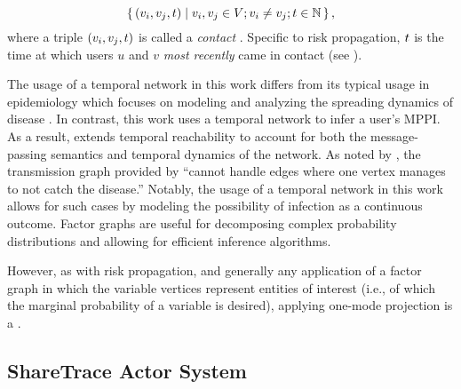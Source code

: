 \begin{equation}
    \set{ (v_{i}, v_{j}, t) | v_{i}, v_{j} \in V; v_{i} \neq v_{j}; t\in \mathbb{N}}, \label{eq:contact-seq}
\end{equation}
%
where a triple $(v_{i}, v_{j}, t)$ is called a \emph{contact} \cite{Holme2012}. Specific to risk propagation, $t$ is the time at which users $u$ and $v$ \emph{most recently} came in contact (see ).

The usage of a temporal network in this work differs from its typical usage in epidemiology which focuses on modeling and analyzing the spreading dynamics of disease \cite{Riolo2001, Danon2011, Lokhov2014, Craft2015, Pastor-Satorras2015, Koher2019, Zino2021}. In contrast, this work uses a temporal network to infer a user's MPPI. As a result,  extends temporal reachability to account for both the message-passing semantics and temporal dynamics of the network. As noted by \cite{Holme2012}, the transmission graph provided by \cite{Riolo2001} ``cannot handle edges where one vertex manages to not catch the disease.'' Notably, the usage of a temporal network in this work allows for such cases by modeling the possibility of infection as a continuous outcome.
Factor graphs are useful for decomposing complex probability distributions and allowing for efficient inference algorithms.

However, as with risk propagation, and generally any application of a factor graph in which the variable vertices represent entities of interest (i.e., of which the marginal probability of a variable is desired), applying one-mode projection is a .

\subsection{ShareTrace Actor System}

